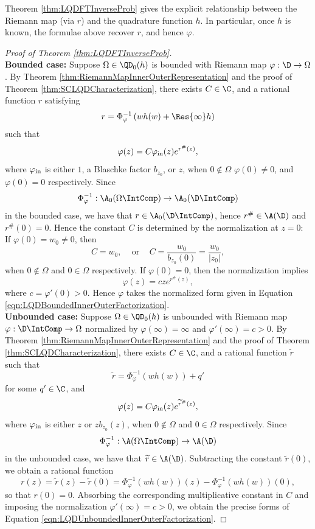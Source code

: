 \documentclass{article}
\numberwithin{equation}{section}
\begin{document}
Theorem \ref{thm:LQDFTInverseProb} gives the explicit relationship between the Riemann map (via $r$) and the quadrature function $h$. In particular, once $h$ is known, the formulae above recover $r$, and hence $\varphi$.
\begin{proof}[Proof of Theorem \ref{thm:LQDFTInverseProb}]\;\\
{\bf Bounded case:} Suppose $\Omega\in\QD_0(h)$ is bounded with Riemann map $\varphi:\D\rightarrow\Omega$. By Theorem \ref{thm:RiemannMapInnerOuterRepresentation} and the proof of Theorem \ref{thm:SCLQDCharacterization}, there exists $C\in\C$, and a rational function $r$ satisfying
$$r=\Phi_{\varphi}^{-1}\left(wh(w)+\Res{\infty}h\right)$$
such that
$$\varphi(z)=C\varphi_{\rm in}(z)e^{r^{\#}(z)},$$
where $\varphi_{\rm in}$ is either $1$, a Blaschke factor $b_{z_0}$, or $z$, when $0\notin\Omega$ $\varphi(0)\neq0$, and $\varphi(0)=0$ respectively. Since
$$\Phi_{\varphi}^{-1}:\A_0(\Omega\IntComp)\rightarrow\A_0(\D\IntComp)$$
in the bounded case, we have that $r\in\A_0(\D\IntComp)$, hence $r^{\#}\in\A(\D)$ and $r^{\#}(0)=0$. Hence the constant $C$ is determined by the normalization at $z=0$: If $\varphi(0)=w_0\neq0$, then
$$C=w_0,\;\;\;\text{ or }\;\;\; C=\dfrac{w_0}{b_{z_0}(0)}=\dfrac{w_0}{|z_0|},$$
when $0\notin\Omega$ and $0\in\Omega$ respectively. If $\varphi(0)=0$, then the normalization implies
$$\varphi(z)=cze^{r^{\#}(z)},$$
where $c=\varphi'(0)>0$. Hence $\varphi$ takes the normalized form given in Equation \ref{eqn:LQDBoundedInnerOuterFactorization}.\\

{\bf Unbounded case:} Suppose $\Omega\in\QD_0(h)$ is unbounded with Riemann map $\varphi:\D\IntComp\rightarrow\Omega$ normalized by $\varphi(\infty)=\infty$ and $\varphi'(\infty)=c>0$. By Theorem \ref{thm:RiemannMapInnerOuterRepresentation} and the proof of Theorem \ref{thm:SCLQDCharacterization}, there exists $C\in\C$, and a rational function $\widetilde{r}$ such that
$$\widetilde{r}=\Phi_{\varphi}^{-1}\left(wh(w)\right)+q'$$
for some $q'\in\C$, and
$$\varphi(z)=C\varphi_{\rm in}(z)e^{\widetilde{r}^{\#}(z)},$$
where $\varphi_{\rm in}$ is either $z$ or $zb_{z_0}(z)$, when $0\notin\Omega$ and $0\in\Omega$ respectively. Since
$$\Phi_{\varphi}^{-1}:\A(\Omega\IntComp)\rightarrow\A(\D)$$
in the unbounded case, we have that $\widetilde{r}\in\A(\D)$. Subtracting the constant $\widetilde{r}(0)$, we obtain a rational function 
$$r(z)=\widetilde{r}(z)-\widetilde{r}(0)=\Phi_{\varphi}^{-1}\left(wh(w)\right)(z)-\Phi_{\varphi}^{-1}\left(wh(w)\right)(0),$$
so that $r(0)=0$. Absorbing the corresponding multiplicative constant in $C$ and imposing the normalization $\varphi'(\infty)=c>0$, we obtain the precise forms of Equation \ref{eqn:LQDUnboundedInnerOuterFactorization}.
\end{proof}
\end{document}
